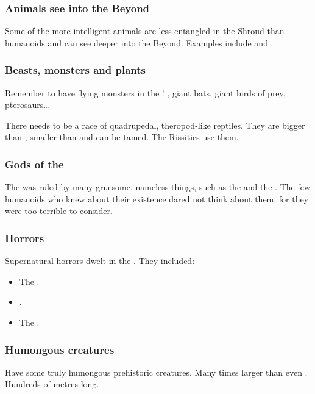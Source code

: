 \subsubsection{Animals see into the Beyond}
Some of the more intelligent animals are less entangled in the Shroud than humanoids and can see deeper into the Beyond. 
Examples include  and .  





\subsubsection{Beasts, monsters and plants}
Remember to have flying monsters in the \Wylde{}! 
, giant bats, giant birds of prey, pterosaurs\ldots{} 

There needs to be a race of quadrupedal, theropod-like reptiles. 
They are bigger than \nycans, smaller than \cortios{} and can be tamed. 
The Rissitics use them. 





\subsubsection{Gods of the \wylde}
The \wylde was ruled by many gruesome, nameless things, such as the  and the . 
The few humanoids who knew about their existence dared not think about them, for they were too terrible to consider.





\subsubsection{Horrors}
Supernatural horrors dwelt in the \wylde. 
They included:
\begin{itemize}
  \item The . 
  \item {}.
  \item The .
\end{itemize}






\subsubsection{Humongous creatures}
Have some truly humongous prehistoric creatures. 
Many times larger than even \dragons. 
Hundreds of metres long. 

